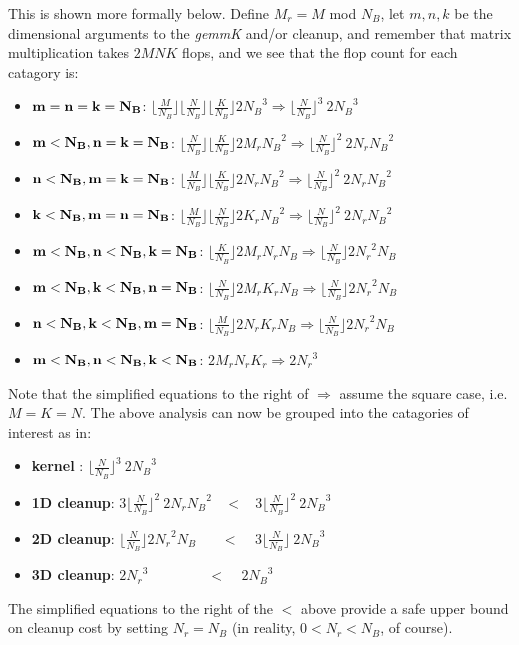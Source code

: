 \documentclass[11pt]{article}
\newcommand{\Wfloor}[1]{\lfloor #1 \rfloor}
\begin{document}
This is shown more formally below.  Define $M_r = M$ mod $N_B$, let 
$m, n, k$ be the dimensional arguments to the {\it gemmK} and/or cleanup,
and remember that matrix multiplication takes $2 M N K$ flops, and we see
that the flop count for each catagory is:
\begin{itemize}
\item {$\bf m=n=k=N_B$}: 
   $\Wfloor{\frac{M}{N_B}} \Wfloor{\frac{N}{N_B}} \Wfloor{\frac{K}{N_B}} 
   2 {N_B}^3 \Longrightarrow \Wfloor{\frac{N}{N_B}}^3 ~2 {N_B}^3$

\item $\bf m < N_B, n = k = N_B$:
   $\Wfloor{\frac{N}{N_B}} \Wfloor{\frac{K}{N_B}} 2 M_r {N_B}^2
    \Longrightarrow \Wfloor{\frac{N}{N_B}}^2 ~2 N_r {N_B}^2$
\item $\bf n < N_B, m = k = N_B$:
   $\Wfloor{\frac{M}{N_B}} \Wfloor{\frac{K}{N_B}} 2 N_r {N_B}^2
    \Longrightarrow \Wfloor{\frac{N}{N_B}}^2 ~2 N_r {N_B}^2$
\item $\bf k < N_B, m = n = N_B$:
   $\Wfloor{\frac{M}{N_B}} \Wfloor{\frac{N}{N_B}} 2 K_r {N_B}^2
    \Longrightarrow \Wfloor{\frac{N}{N_B}}^2 ~2 N_r {N_B}^2$

\item $\bf m < N_B, n < N_B, k = N_B$:
   $\Wfloor{\frac{K}{N_B}} 2 M_r N_r {N_B} 
    \Longrightarrow \Wfloor{\frac{N}{N_B}} 2 {N_r}^2 N_B$
\item $\bf m < N_B, k < N_B, n = N_B$:
   $\Wfloor{\frac{N}{N_B}} 2 M_r K_r {N_B}
    \Longrightarrow \Wfloor{\frac{N}{N_B}} 2 {N_r}^2 N_B$
\item $\bf n < N_B, k < N_B, m = N_B$:
   $\Wfloor{\frac{M}{N_B}} 2 N_r K_r {N_B}
    \Longrightarrow \Wfloor{\frac{N}{N_B}} 2 {N_r}^2 N_B$
\item $\bf m < N_B, n < N_B, k < N_B$:
   $2 M_r N_r K_r \Longrightarrow 2 {N_r}^3$
\end{itemize}

Note that the simplified equations to the right of $\Longrightarrow$ 
assume the square case, i.e. $M = K = N$.  The above analysis can now
be grouped into the catagories of interest as in:
\begin{itemize}
  \item {\bf kernel} : $\Wfloor{\frac{N}{N_B}}^3 ~2 {N_B}^3$
  \item {\bf 1D cleanup}: $3 \Wfloor{\frac{N}{N_B}}^2 ~2 N_r {N_B}^2
     ~~~~<~~~~ 3  \Wfloor{\frac{N}{N_B}}^2 ~2 {N_B}^3$
  \item {\bf 2D cleanup}: $\Wfloor{\frac{N}{N_B}} 2 {N_r}^2 N_B
     ~~~~~~~~<~~~~~ 3 \Wfloor{\frac{N}{N_B}} ~2 {N_B}^3$
  \item {\bf 3D cleanup}: $2 {N_r}^3 ~~~~~~~~~~~~~~~~~~~<~~~~~ 2 {N_B}^3$
\end{itemize}
The simplified equations to the right of the $<$ above provide a safe
upper bound on cleanup cost by setting $N_r = N_B$
(in reality, $0 < N_r < N_B$, of course).
\end{document}

